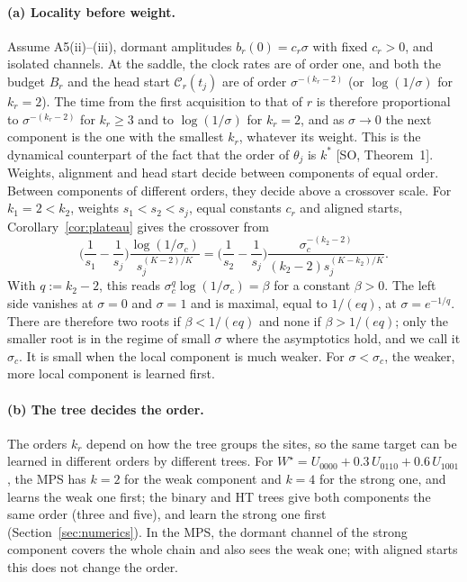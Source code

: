 \documentclass[11pt]{article}
\newcommand{\SO}{\textsf{SO}}
\newcommand{\so}[1]{[\SO, #1]}
\newcommand{\Clk}{\mathcal{C}}
\theoremstyle{definition}
\numberwithin{equation}{section}
\begin{document}
\paragraph{(a) Locality before weight.} Assume A5(ii)--(iii), dormant amplitudes $b_r(0)=c_r\sigma$ with fixed $c_r>0$, and isolated channels. At the saddle, the clock rates are of order one, and both the budget $B_r$ and the head start $\Clk_r(t_j)$ are of order $\sigma^{-(k_r-2)}$ (or $\log(1/\sigma)$ for $k_r=2$). The time from the first acquisition to that of $r$ is therefore proportional to $\sigma^{-(k_r-2)}$ for $k_r\ge3$ and to $\log(1/\sigma)$ for $k_r=2$, and as $\sigma\to0$ the next component is the one with the smallest $k_r$, whatever its weight. This is the dynamical counterpart of the fact that the order of $\theta_j$ is $k^*$ \so{Theorem~1}. Weights, alignment and head start decide between components of equal order. Between components of different orders, they decide above a crossover scale. For $k_1=2<k_2$, weights $s_1<s_2<s_j$, equal constants $c_r$ and aligned starts, Corollary~\ref{cor:plateau} gives the crossover from
\begin{equation}\label{eq:crossover}
\Big(\frac1{s_1}-\frac1{s_j}\Big)\frac{\log(1/\sigma_c)}{s_j^{(K-2)/K}}=\Big(\frac1{s_2}-\frac1{s_j}\Big)\frac{\sigma_c^{-(k_2-2)}}{(k_2-2)s_j^{(K-k_2)/K}}.
\end{equation}
With $q:=k_2-2$, this reads $\sigma_c^q\log(1/\sigma_c)=\beta$ for a constant $\beta>0$. The left side vanishes at $\sigma=0$ and $\sigma=1$ and is maximal, equal to $1/(eq)$, at $\sigma=e^{-1/q}$. There are therefore two roots if $\beta<1/(eq)$ and none if $\beta>1/(eq)$; only the smaller root is in the regime of small $\sigma$ where the asymptotics hold, and we call it $\sigma_c$. It is small when the local component is much weaker. For $\sigma<\sigma_c$, the weaker, more local component is learned first.

\paragraph{(b) The tree decides the order.} The orders $k_r$ depend on how the tree groups the sites, so the same target can be learned in different orders by different trees. For $W^\star=U_{0000}+0.3\,U_{0110}+0.6\,U_{1001}$, the MPS has $k=2$ for the weak component and $k=4$ for the strong one, and learns the weak one first; the binary and HT trees give both components the same order (three and five), and learn the strong one first (Section~\ref{sec:numerics}). In the MPS, the dormant channel of the strong component covers the whole chain and also sees the weak one; with aligned starts this does not change the order.
\end{document}
